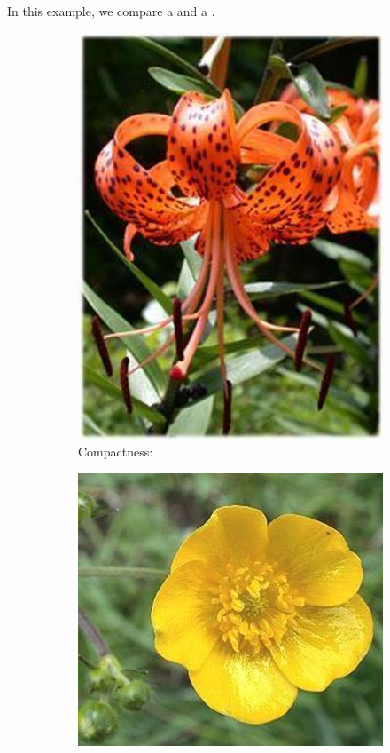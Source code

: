 \documentclass[11]{article}
\begin{document}
 \noindent In this example, we compare a \textit{} and a \textit{}.
 \begin{figure}[H]
    \begin{subfigure}[t]{.49\linewidth}
    \centering
  \includegraphics[scale=0.25]{images/compactness1.jpg}
  \caption{Compactness: \textbf{ }}
  \label{original}
    \end{subfigure}
    \begin{subfigure}[t]{.49\linewidth}
    \centering
    \includegraphics[scale=0.2]{images/compactness2.jpg}

\end{subfigure}
\end{figure}
\end{document}
